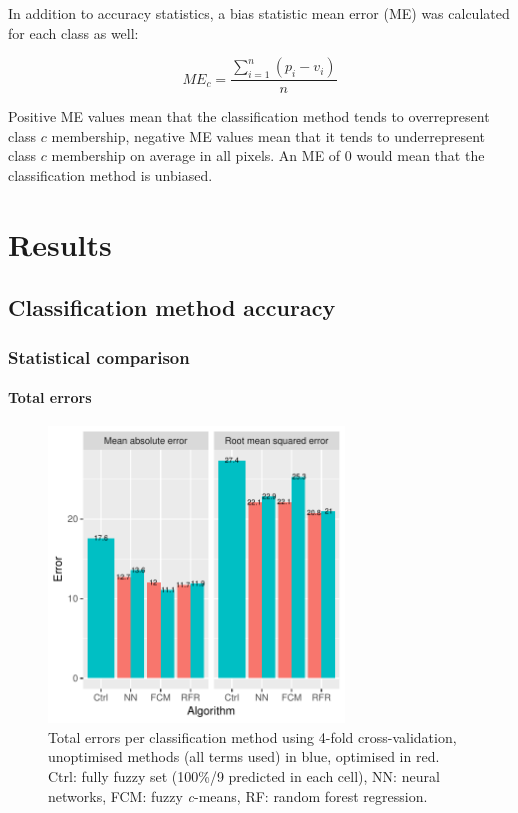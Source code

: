 \documentclass[a4paper,10pt]{book}
\begin{document}
In addition to accuracy statistics, a bias statistic mean error (ME) was calculated for each class as well:

$$ ME_c = \frac{\displaystyle\sum_{i=1}^{n}{ (p_{i} - v_{i}) }}{n} $$

Positive ME values mean that the classification method tends to overrepresent class $c$ membership, negative ME values mean that it tends to underrepresent class $c$ membership on average in all pixels. An ME of 0 would mean that the classification method is unbiased.

\chapter{Results}

\section{Classification method accuracy}

\subsection{Statistical comparison}

\subsubsection{Total errors}

\begin{figure}
  \centering
  \includegraphics[width=0.7\textwidth]{../plot/total-errors}
  \caption{Total errors per classification method using 4-fold cross-validation, unoptimised methods (all terms used) in blue, optimised in red. Ctrl: fully fuzzy set (100\%/9 predicted in each cell), NN: neural networks, FCM: fuzzy \textit{c}-means, RF: random forest regression.}
  \label{fig-total-errors}
\end{figure}
\end{document}
